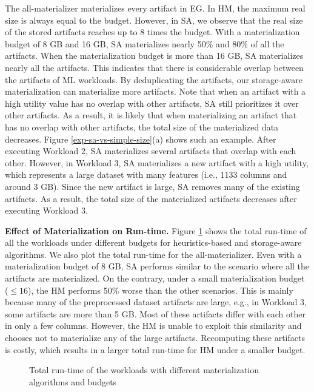 The all-materializer materializes every artifact in EG.
In HM, the maximum real size is always equal to the budget.
However, in SA, we observe that the real size of the stored artifacts reaches up to 8 times the budget.
With a materialization budget of 8 GB and 16 GB, SA materializes nearly 50\% and 80\% of all the artifacts.
When the materialization budget is more than 16 GB, SA materializes nearly all the artifacts.
This indicates that there is considerable overlap between the artifacts of ML workloads.
By deduplicating the artifacts, our storage-aware materialization can materialize more artifacts.
Note that when an artifact with a high utility value has no overlap with other artifacts, SA still prioritizes it over other artifacts.
As a result, it is likely that when materializing an artifact that has no overlap with other artifacts, the total size of the materialized data decreases.
Figure \ref{exp-sa-vs-simple-size}(a) shows such an example.
After executing Workload 2, SA materializes several artifacts that overlap with each other.
However, in Workload 3, SA materializes a new artifact with a high utility, which represents a large dataset with many features (i.e., 1133 columns and around 3 GB).
Since the new artifact is large, SA removes many of the existing artifacts.
As a result, the total size of the materialized artifacts decreases after executing Workload 3.

\textbf{Effect of Materialization on Run-time.}
Figure \ref{run-time-vs-mat} shows the total run-time of all the workloads under different budgets for heuristics-based and storage-aware algorithms.
We also plot the total run-time for the all-materializer.
Even with a materialization budget of 8 GB, SA performs similar to the scenario where all the artifacts are materialized.
On the contrary, under a small materialization budget ($\leq 16$), the HM performs 50\% worse than the other scenarios.
This is mainly because many of the preprocessed dataset artifacts are large, e.g., in Workload 3, some artifacts are more than 5 GB.
Most of these artifacts differ with each other in only a few columns.
However, the HM is unable to exploit this similarity and chooses not to materialize any of the large artifacts.
Recomputing these artifacts is costly, which results in a larger total run-time for HM under a smaller budget.
\begin{figure}[h]
\centering
 \resizebox{\columnwidth}{!}{%
%
}
\caption{Total run-time of the workloads with different materialization algorithms and budgets}
\label{run-time-vs-mat}
\end{figure}

